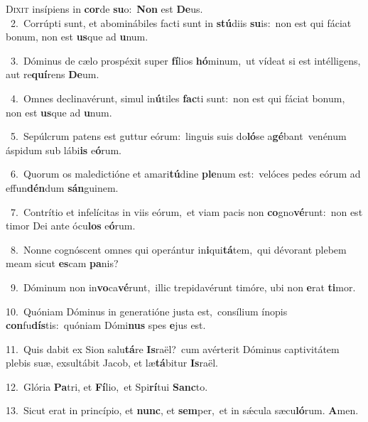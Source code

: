 \lettrine{\initial\textcolor{\initialcolor}{D}}{ixit} insípiens in \textbf{cor}\-de \textbf{su}\-o:~\star \textbf{Non} est \textbf{De}\-us.\\
{\numbfont\textcolor{\numbcolor}{~2.}}~Corrúpti sunt, et abominábiles facti sunt in \textbf{stú}\-diis \textbf{su}\-is:~\star non est qui fáciat bonum, non est \textbf{us}\-que ad \textbf{u}\-num.\par
{\numbfont\textcolor{\numbcolor}{~3.}}~Dóminus de cælo prospéxit super \textbf{fí}\-lios \textbf{hó}\-minum,~\star ut vídeat si est intélligens, aut re\-\textbf{quí}\-rens \textbf{De}\-um.\par
{\numbfont\textcolor{\numbcolor}{~4.}}~Omnes declinavérunt, simul in\-\textbf{ú}\-tiles \textbf{fac}\-ti sunt:~\star non est qui fáciat bonum, non est \textbf{us}\-que ad \textbf{u}\-num.\par
{\numbfont\textcolor{\numbcolor}{~5.}}~Sepúlcrum patens est guttur eórum:~\dagger linguis suis do\-\textbf{ló}\-se a\-\textbf{gé}\-bant~\star venénum áspidum sub lábi\textbf{is} e\-\textbf{ó}\-rum.\par
{\numbfont\textcolor{\numbcolor}{~6.}}~Quorum os maledictióne et amari\-\textbf{tú}\-dine \textbf{ple}\-num est:~\star velóces pedes eórum ad effun\-\textbf{dén}\-dum \textbf{sán}\-guinem.\par
{\numbfont\textcolor{\numbcolor}{~7.}}~Contrítio et infelícitas in viis eórum,~\dagger et viam pacis non \textbf{co}\-gno\-\textbf{vé}\-runt:~\star non est timor Dei ante ócu\textbf{los} e\-\textbf{ó}\-rum.\par
{\numbfont\textcolor{\numbcolor}{~8.}}~Nonne cognóscent omnes qui operántur in\-\textbf{i}\-qui\-\textbf{tá}\-tem,~\star qui dévorant plebem meam sicut \textbf{es}\-cam \textbf{pa}\-nis?\par
{\numbfont\textcolor{\numbcolor}{~9.}}~Dóminum non in\-\textbf{vo}\-ca\-\textbf{vé}\-runt,~\star illic trepidavérunt timóre, ubi non \textbf{e}\-rat \textbf{ti}\-mor.\par
{\numbfont\textcolor{\numbcolor}{10.}}~Quóniam Dóminus in generatióne justa est,~\dagger consílium ínopis \textbf{con}\-fu\-\textbf{dís}\-tis:~\star quóniam Dómi\textbf{nus} spes \textbf{e}\-jus est.\par
{\numbfont\textcolor{\numbcolor}{11.}}~Quis dabit ex Sion salu\-\textbf{tá}\-re \textbf{Is}\-raël?~\star cum avérterit Dóminus captivitátem plebis suæ, exsultábit Jacob, et læ\-\textbf{tá}\-bitur \textbf{Is}\-raël.\par
{\numbfont\textcolor{\numbcolor}{12.}}~Glória \textbf{Pa}\-tri, et \textbf{Fí}\-lio,~\star et Spi\-\textbf{rí}\-tui \textbf{Sanc}\-to.\par
{\numbfont\textcolor{\numbcolor}{13.}}~Sicut erat in princípio, et \textbf{nunc}\-, et \textbf{sem}\-per,~\star et in sǽcula sæcu\-\textbf{ló}\-rum. \textbf{A}\-men.\par
